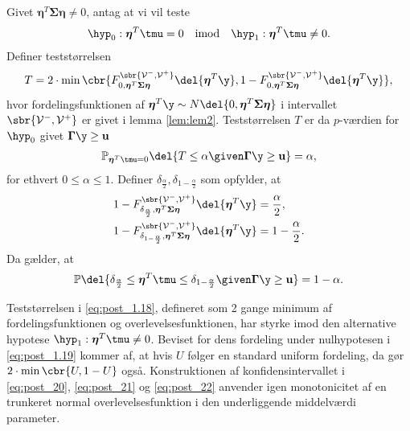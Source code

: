 \begin{lem} \label{lem:lem4}
Givet \(\boldsymbol{\eta}^T \boldsymbol{\Sigma} \boldsymbol{\eta} \neq 0\), antag at vi vil teste
\begin{align*}
\hyp_0: \boldsymbol{\eta}^T \tmu=0 \quad \text{imod} \quad \hyp_1: \boldsymbol{\eta}^T \tmu \neq 0.
\end{align*}
Definer teststørrelsen
\begin{align}
T=2 \cdot \min\cbr{F_{0, \boldsymbol{\eta}^T \boldsymbol{\Sigma} \boldsymbol{\eta}}^{\sbr{\mathcal{V}^-, \mathcal{V}^+}} \del{\boldsymbol{\eta}^T \y}, 1 - F_{0, \boldsymbol{\eta}^T \boldsymbol{\Sigma} \boldsymbol{\eta}}^{\sbr{\mathcal{V}^-, \mathcal{V}^+}} \del{\boldsymbol{\eta}^T \y}}, \label{eq:post_1.18}
\end{align}
hvor fordelingsfunktionen af \(\boldsymbol{\eta}^T \y \sim N \del{0,  \boldsymbol{\eta}^T \boldsymbol{\Sigma} \boldsymbol{\eta}}\) i intervallet \(\sbr{\mathcal{V}^-, \mathcal{V}^+}\) er givet i lemma \ref{lem:lem2}.
Teststørrelsen \(T\) er da \(p\)-værdien for \(\hyp_0\) givet \(\boldsymbol{\Gamma} \y \geq \mathbf{u}\)
\begin{align}
\mathbb{P}_{\boldsymbol{\eta}^T \tmu=0} \del{T \leq \alpha \given \boldsymbol{\Gamma} \y \geq \mathbf{u}} = \alpha, \label{eq:post_1.19}
\end{align}
for ethvert \(0 \leq \alpha \leq 1\). 
Definer \(\delta_{\frac{\alpha}{2}}, \delta_{1-\frac{\alpha}{2}}\) som opfylder, at
\begin{align}
1-F_{\delta_{\frac{\alpha}{2}}, \boldsymbol{\eta}^T \boldsymbol{\Sigma} \boldsymbol{\eta}}^{\sbr{\mathcal{V}^-, \mathcal{V}^+}} \del{\boldsymbol{\eta}^T \y} &= \frac{\alpha}{2}, \label{eq:post_20} \\
1-F_{\delta_{1-\frac{\alpha}{2}}, \boldsymbol{\eta}^T \boldsymbol{\Sigma} \boldsymbol{\eta} }^{\sbr{\mathcal{V}^-, \mathcal{V}^+}} \del{\boldsymbol{\eta}^T \y} &= 1-\frac{\alpha}{2}. \label{eq:post_21}
\end{align}
Da gælder, at
\begin{align}
\mathbb{P} \del{\delta_{\frac{\alpha}{2}} \leq  \boldsymbol{\eta}^T \tmu \leq \delta_{1-\frac{\alpha}{2}} \given \boldsymbol{\Gamma} \y \geq \mathbf{u}} = 1- \alpha. \label{eq:post_22}
\end{align}
\end{lem}
%
Teststørrelsen i \eqref{eq:post_1.18}, defineret som 2 gange minimum af fordelingsfunktionen  og overlevelsesfunktionen, har styrke imod den alternative hypotese \(\hyp_1: \boldsymbol{\eta}^T \tmu \neq 0\).
Beviset for dens fordeling under nulhypotesen i \eqref{eq:post_1.19} kommer af, at hvis \(U\) følger en standard uniform fordeling, da gør \(2 \cdot \min \cbr{U,1-U}\) også.
Konstruktionen af konfidensintervallet i \eqref{eq:post_20}, \eqref{eq:post_21} og \eqref{eq:post_22} anvender igen monotonicitet af en trunkeret normal overlevelsesfunktion i den underliggende middelværdi parameter.


